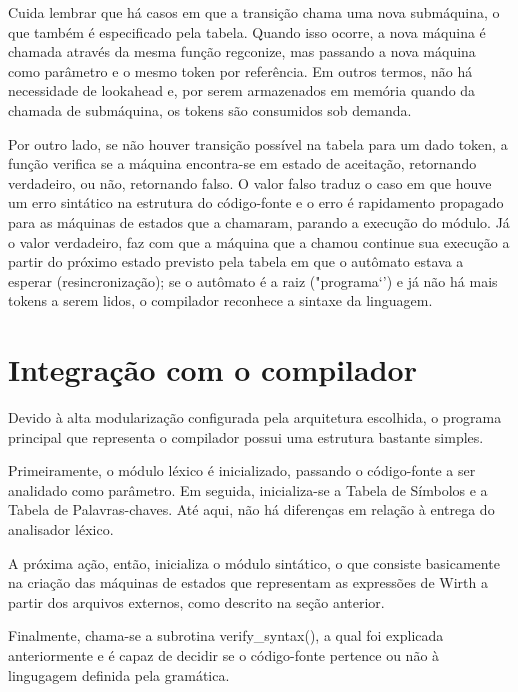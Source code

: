 \documentclass[12pt,oneside,a4paper,english]{abntex2}
\begin{document}
  Cuida lembrar que há casos em que a transição chama uma nova submáquina, o que também é especificado pela tabela. Quando isso ocorre, a nova máquina é chamada através da mesma função regconize, mas passando a nova máquina como parâmetro e o mesmo token por referência. Em outros termos, não há necessidade de lookahead e, por serem armazenados em memória quando da chamada de submáquina, os tokens são consumidos sob demanda.


  Por outro lado, se não houver transição possível na tabela para um dado token, a função verifica se a máquina encontra-se em estado de aceitação, retornando verdadeiro, ou não, retornando falso. O valor falso traduz o caso em que houve um erro sintático na estrutura do código-fonte e o erro é rapidamento propagado para as máquinas de estados que a chamaram, parando a execução do módulo. Já o valor verdadeiro, faz com que a máquina que a chamou continue sua execução a partir do próximo estado previsto pela tabela em que o autômato estava a esperar (resincronização); se o autômato é a raiz ("programa`') e já não há mais tokens a serem lidos, o compilador reconhece a sintaxe da linguagem.


  \section{Integração com o compilador}


  Devido à alta modularização configurada pela arquitetura escolhida, o programa principal que representa o compilador possui uma estrutura bastante simples. 


  Primeiramente, o módulo léxico é inicializado, passando o código-fonte a ser analidado como parâmetro. Em seguida, inicializa-se a Tabela de Símbolos e a Tabela de Palavras-chaves. Até aqui, não há diferenças em relação à entrega do analisador léxico.


  A próxima ação, então, inicializa o módulo sintático, o que consiste basicamente na criação das máquinas de estados que representam as expressões de Wirth a partir dos arquivos externos, como descrito na seção anterior.

 
 Finalmente, chama-se a subrotina verify\_syntax(), a qual foi explicada anteriormente e é capaz de decidir se o código-fonte pertence ou não à lingugagem definida pela gramática.
\end{document}
